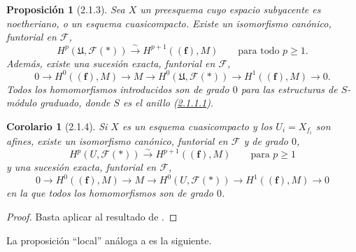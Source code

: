 \documentclass[10pt,oneside,openany]{book}
\theoremstyle{egaenv}\newtheorem*{env}{---}
\theoremstyle{egastatement}
\newtheorem*{proposition}{Proposición}
\newtheorem*{corollary}{Corolario}
\theoremstyle{egadescription}
\newcommand{\oldpage}[2][]{\marginnote{\normalfont\scriptsize\textbf{#1}\,|\,#2}\ignorespaces}
\renewcommand{\geq}{\geqslant}
\begin{document}
\begin{proposition}[2.1.3]
\label{III.2.1.3}
\label{III.2.1.3-fr}
Sea $X$ un preesquema cuyo espacio subyacente es noetheriano, o un esquema cuasicompacto.
Existe un isomorfismo canónico, funtorial en $\mathcal F$,
\begin{equation}
\label{III.2.1.3.1-fr}
\tag{2.1.3.1}
H^p(\mathfrak U,\mathcal F(*))
\xrightarrow{\sim}H^{p+1}((\mathbf f),M)
\qquad\text{para todo }p\geq1.
\end{equation}
Además, existe una sucesión exacta, funtorial en $\mathcal F$,
\begin{equation}
\label{III.2.1.3.2-fr}
\tag{2.1.3.2}
0\longrightarrow H^0((\mathbf f),M)\longrightarrow M
\longrightarrow H^0(\mathfrak U,\mathcal F(*))
\longrightarrow H^1((\mathbf f),M)\longrightarrow0.
\end{equation}
Todos los homomorfismos introducidos son de grado $0$ para las estructuras de $S$-módulo graduado, donde $S$ es el anillo (\hyperref[III.2.1.1.1]{2.1.1.1}).
\end{proposition}

\begin{corollary}[2.1.4]
\label{III.2.1.4}
\label{III.2.1.4-fr}
\oldpage[III]{97}
Si $X$ es un esquema cuasicompacto y los $U_i=X_{f_i}$ son afines, existe un isomorfismo canónico, funtorial en $\mathcal F$ y de grado $0$,
\begin{equation}
\label{III.2.1.4.1-fr}
\tag{2.1.4.1}
H^p(U,\mathcal F(*))\xrightarrow{\sim}H^{p+1}((\mathbf f),M)
\qquad\text{para }p\geq1
\end{equation}
y una sucesión exacta, funtorial en $\mathcal F$,
\begin{equation}
\label{III.2.1.4.2-fr}
\tag{2.1.4.2}
0\longrightarrow H^0((\mathbf f),M)\longrightarrow M
\longrightarrow H^0(U,\mathcal F(*))
\longrightarrow H^1((\mathbf f),M)\longrightarrow0
\end{equation}
en la que todos los homomorfismos son de grado $0$.
\end{corollary}

\begin{proof}
Basta aplicar  al resultado de .
\end{proof}

La proposición ``local'' análoga a  es la siguiente.
\end{document}
